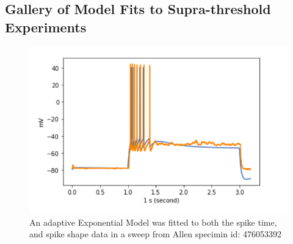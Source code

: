 \subsection{Gallery of Model Fits to Supra-threshold Experiments}

\begin{figure}
    \centering
    \includegraphics[scale=0.75]{figures/adexp_fit_allen_spec_id_476053392.png}
    \caption{An adaptive Exponential Model was fitted to both the spike time, and spike shape data in a sweep from Allen specimin id: 476053392} \label{fig:specimen_476053392}
\end{figure}


